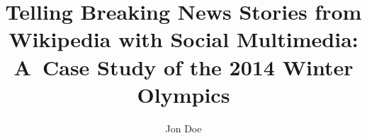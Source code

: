 \documentclass{sig-alternate}
\begin{document}
%

\title{Telling Breaking News Stories from Wikipedia with Social Multimedia: A~Case Study of the 2014 Winter Olympics}


\author{
\alignauthor
Jon Doe\\%
  \\%
  \\       %
}
\end{document}
